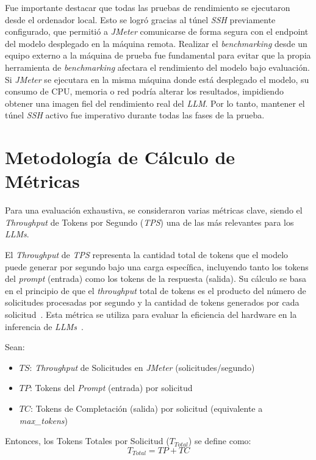 Fue importante destacar que todas las pruebas de rendimiento se ejecutaron desde el ordenador local. Esto se logró gracias al túnel \textit{SSH} previamente configurado, que permitió a \textit{JMeter} comunicarse de forma segura con el endpoint del modelo desplegado en la máquina remota. Realizar el \textit{benchmarking} desde un equipo externo a la máquina de prueba fue fundamental para evitar que la propia herramienta de \textit{benchmarking} afectara el rendimiento del modelo bajo evaluación. Si \textit{JMeter} se ejecutara en la misma máquina donde está desplegado el modelo, su consumo de CPU, memoria o red podría alterar los resultados, impidiendo obtener una imagen fiel del rendimiento real del \textit{LLM}. Por lo tanto, mantener el túnel \textit{SSH} activo fue imperativo durante todas las fases de la prueba.

\section{Metodología de Cálculo de Métricas}
Para una evaluación exhaustiva, se consideraron varias métricas clave, siendo el \textit{Throughput} de Tokens por Segundo (\textit{TPS}) una de las más relevantes para los \textit{LLMs}.

El \textit{Throughput} de \textit{TPS} representa la cantidad total de tokens que el modelo puede generar por segundo bajo una carga específica, incluyendo tanto los tokens del \textit{prompt} (entrada) como los tokens de la respuesta (salida). Su cálculo se basa en el principio de que el \textit{throughput} total de tokens es el producto del número de solicitudes procesadas por segundo y la cantidad de tokens generados por cada solicitud~\cite{ref29,ref30}. Esta métrica se utiliza para evaluar la eficiencia del hardware en la inferencia de \textit{LLMs}~\cite{ref31}.

Sean:
\begin{itemize}
    \item $TS$: \textit{Throughput} de Solicitudes en \textit{JMeter} (solicitudes/segundo)
    \item $TP$: Tokens del \textit{Prompt} (entrada) por solicitud
    \item $TC$: Tokens de Completación (salida) por solicitud (equivalente a \textit{max\_tokens})
\end{itemize}
Entonces, los Tokens Totales por Solicitud ($T_{Total}$) se define como:
\begin{equation*}
T_{Total} = TP + TC
\end{equation*}

